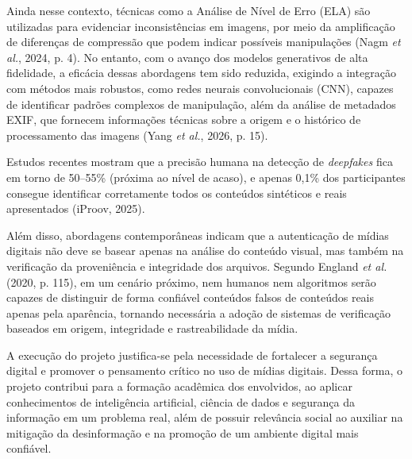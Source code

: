 Ainda nesse contexto, técnicas como a Análise de Nível de Erro (ELA) são
utilizadas para evidenciar inconsistências em imagens, por meio da amplificação
de diferenças de compressão que podem indicar possíveis manipulações (Nagm
\textit{et al.}, 2024, p. 4). No entanto, com o avanço dos modelos generativos de
alta fidelidade, a eficácia dessas abordagens tem sido reduzida, exigindo a
integração com métodos mais robustos, como redes neurais convolucionais (CNN),
capazes de identificar padrões complexos de manipulação, além da análise de
metadados EXIF, que fornecem informações técnicas sobre a origem e o histórico de
processamento das imagens (Yang \textit{et al.}, 2026, p. 15).

Estudos recentes mostram que a precisão humana na detecção de \textit{deepfakes}
fica em torno de 50--55\% (próxima ao nível de acaso), e apenas 0,1\% dos
participantes consegue identificar corretamente todos os conteúdos sintéticos e
reais apresentados (iProov, 2025).

Além disso, abordagens contemporâneas indicam que a autenticação de mídias
digitais não deve se basear apenas na análise do conteúdo visual, mas também na
verificação da proveniência e integridade dos arquivos. Segundo England
\textit{et al.} (2020, p. 115), em um cenário próximo, nem humanos nem algoritmos
serão capazes de distinguir de forma confiável conteúdos falsos de conteúdos
reais apenas pela aparência, tornando necessária a adoção de sistemas de
verificação baseados em origem, integridade e rastreabilidade da mídia.

A execução do projeto justifica-se pela necessidade de fortalecer a segurança
digital e promover o pensamento crítico no uso de mídias digitais. Dessa forma, o
projeto contribui para a formação acadêmica dos envolvidos, ao aplicar
conhecimentos de inteligência artificial, ciência de dados e segurança da
informação em um problema real, além de possuir relevância social ao auxiliar na
mitigação da desinformação e na promoção de um ambiente digital mais confiável.

